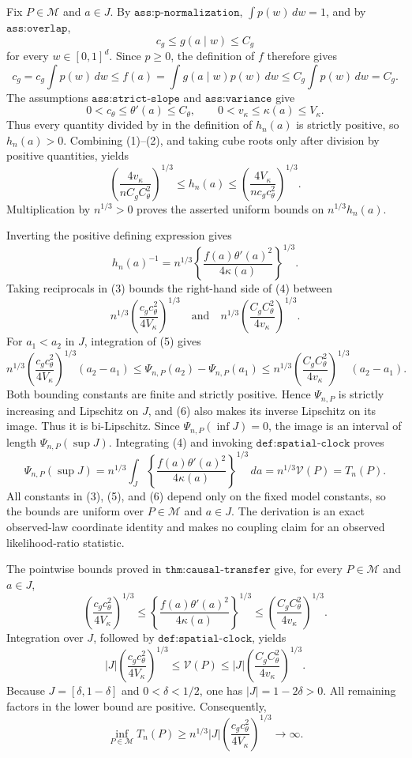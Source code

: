 Fix \(P\in\mathcal M\) and \(a\in J\).  By \(\texttt{ass:p-normalization}\), \(\int p(w)\,dw=1\), and by \(\texttt{ass:overlap}\),
\[
 c_g\le g(a\mid w)\le C_g
\]
for every \(w\in[0,1]^d\).  Since \(p\ge0\), the definition of \(f\) therefore gives
\[
 c_g=c_g\int p(w)\,dw
 \le f(a)=\int g(a\mid w)p(w)\,dw
 \le C_g\int p(w)\,dw=C_g. \tag{1}
\]
The assumptions \(\texttt{ass:strict-slope}\) and \(\texttt{ass:variance}\) give
\[
 0<c_\theta\le\theta'(a)\le C_\theta,
 \qquad
 0<v_\kappa\le\kappa(a)\le V_\kappa. \tag{2}
\]
Thus every quantity divided by in the definition of \(h_n(a)\) is strictly positive, so \(h_n(a)>0\).  Combining (1)--(2), and taking cube roots only after division by positive quantities, yields
\[
 \left(\frac{4v_\kappa}{nC_gC_\theta^2}\right)^{1/3}
 \le h_n(a)\le
 \left(\frac{4V_\kappa}{nc_gc_\theta^2}\right)^{1/3}. \tag{3}
\]
Multiplication by \(n^{1/3}>0\) proves the asserted uniform bounds on \(n^{1/3}h_n(a)\).

Inverting the positive defining expression gives
\[
 h_n(a)^{-1}=n^{1/3}
 \left\{\frac{f(a)\theta'(a)^2}{4\kappa(a)}\right\}^{1/3}. \tag{4}
\]
Taking reciprocals in (3) bounds the right-hand side of (4) between
\[
 n^{1/3}\left(\frac{c_gc_\theta^2}{4V_\kappa}\right)^{1/3}
 \quad\text{and}\quad
 n^{1/3}\left(\frac{C_gC_\theta^2}{4v_\kappa}\right)^{1/3}. \tag{5}
\]
For \(a_1<a_2\) in \(J\), integration of (5) gives
\[
 n^{1/3}\left(\frac{c_gc_\theta^2}{4V_\kappa}\right)^{1/3}(a_2-a_1)
 \le \Psi_{n,P}(a_2)-\Psi_{n,P}(a_1)
 \le n^{1/3}\left(\frac{C_gC_\theta^2}{4v_\kappa}\right)^{1/3}(a_2-a_1). \tag{6}
\]
Both bounding constants are finite and strictly positive.  Hence \(\Psi_{n,P}\) is strictly increasing and Lipschitz on \(J\), and (6) also makes its inverse Lipschitz on its image.  Thus it is bi-Lipschitz.  Since \(\Psi_{n,P}(\inf J)=0\), the image is an interval of length \(\Psi_{n,P}(\sup J)\).  Integrating (4) and invoking \(\texttt{def:spatial-clock}\) proves
\[
 \Psi_{n,P}(\sup J)
 =n^{1/3}\int_J
 \left\{\frac{f(a)\theta'(a)^2}{4\kappa(a)}\right\}^{1/3}\,da
 =n^{1/3}\mathcal V(P)=T_n(P). \tag{7}
\]
All constants in (3), (5), and (6) depend only on the fixed model constants, so the bounds are uniform over \(P\in\mathcal M\) and \(a\in J\).  The derivation is an exact observed-law coordinate identity and makes no coupling claim for an observed likelihood-ratio statistic.

The pointwise bounds proved in \(\texttt{thm:causal-transfer}\) give, for every \(P\in\mathcal M\) and \(a\in J\),
\[
 \left(\frac{c_gc_\theta^2}{4V_\kappa}\right)^{1/3}
 \le
 \left\{\frac{f(a)\theta'(a)^2}{4\kappa(a)}\right\}^{1/3}
 \le
 \left(\frac{C_gC_\theta^2}{4v_\kappa}\right)^{1/3}. \tag{1}
\]
Integration over \(J\), followed by \(\texttt{def:spatial-clock}\), yields
\[
 |J|\left(\frac{c_gc_\theta^2}{4V_\kappa}\right)^{1/3}
 \le\mathcal V(P)\le
 |J|\left(\frac{C_gC_\theta^2}{4v_\kappa}\right)^{1/3}. \tag{2}
\]
Because \(J=[\delta,1-\delta]\) and \(0<\delta<1/2\), one has \(|J|=1-2\delta>0\).  All remaining factors in the lower bound are positive.  Consequently,
\[
 \inf_{P\in\mathcal M}T_n(P)
 \ge n^{1/3}|J|\left(\frac{c_gc_\theta^2}{4V_\kappa}\right)^{1/3}
 \longrightarrow\infty. \tag{3}
\]

